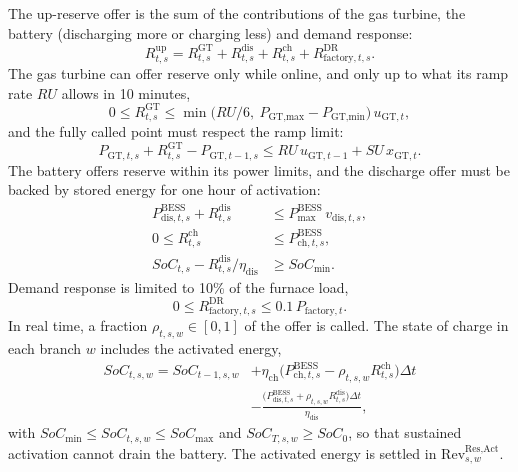 \documentclass[5p,times,twocolumn]{elsarticle}
\begin{document}
The up-reserve offer is the sum of the contributions of the gas turbine, the
battery (discharging more or charging less) and demand response:
\begin{equation}
R_{t,s}^{\text{up}} = R^{\text{GT}}_{t,s} + R^{\text{dis}}_{t,s}
+ R^{\text{ch}}_{t,s} + R_{\text{factory},t,s}^{\text{DR}}.
\label{eq:reserve_cap}
\end{equation}
The gas turbine can offer reserve only while online, and only up to what its ramp
rate $RU$ allows in 10 minutes,
\begin{equation}
0 \le R^{\text{GT}}_{t,s} \le
\min\!\big(RU/6,\ P_{\text{GT,max}}-P_{\text{GT,min}}\big)\,u_{\text{GT},t},
\label{eq:reserve_gt}
\end{equation}
and the fully called point must respect the ramp limit:
\begin{equation}
P_{\text{GT},t,s}+R^{\text{GT}}_{t,s}-P_{\text{GT},t-1,s}
\le RU\,u_{\text{GT},t-1}+SU\,x_{\text{GT},t}.
\label{eq:reserve_gt_ramp}
\end{equation}
The battery offers reserve within its power limits, and the discharge offer must be
backed by stored energy for one hour of activation:
\begin{align}
P^{\text{BESS}}_{\text{dis},t,s} + R^{\text{dis}}_{t,s} &\le P^{\text{BESS}}_{\max}\,v_{\text{dis},t,s},
\label{eq:reserve_dis}\\
0 \le R^{\text{ch}}_{t,s} &\le P^{\text{BESS}}_{\text{ch},t,s},
\label{eq:reserve_ch}\\
SoC_{t,s} - R^{\text{dis}}_{t,s}/\eta_{\text{dis}} &\ge SoC_{\min}.
\label{eq:reserve_energy}
\end{align}
Demand response is limited to 10\% of the furnace load,
\begin{equation}
0\le R_{\text{factory},t,s}^{\text{DR}}\le 0.1\,P_{\text{factory},t}.
\label{eq:reserve_dr}
\end{equation}
In real time, a fraction $\rho_{t,s,w}\in[0,1]$ of the offer is called. The state
of charge in each branch $w$ includes the activated energy,
\begin{equation}
\begin{aligned}
SoC_{t,s,w} = SoC_{t-1,s,w} &+ \eta_{\text{ch}}\big(P^{\text{BESS}}_{\text{ch},t,s}-\rho_{t,s,w}R^{\text{ch}}_{t,s}\big)\Delta t\\
&- \frac{\big(P^{\text{BESS}}_{\text{dis},t,s}+\rho_{t,s,w}R^{\text{dis}}_{t,s}\big)\Delta t}{\eta_{\text{dis}}},
\end{aligned}
\label{eq:soc_branch}
\end{equation}
with $SoC_{\min}\le SoC_{t,s,w}\le SoC_{\max}$ and $SoC_{T,s,w}\ge SoC_{0}$, so
that sustained activation cannot drain the battery. The activated energy is
settled in $\text{Rev}_{s,w}^{\text{Res,Act}}$.
\end{document}
